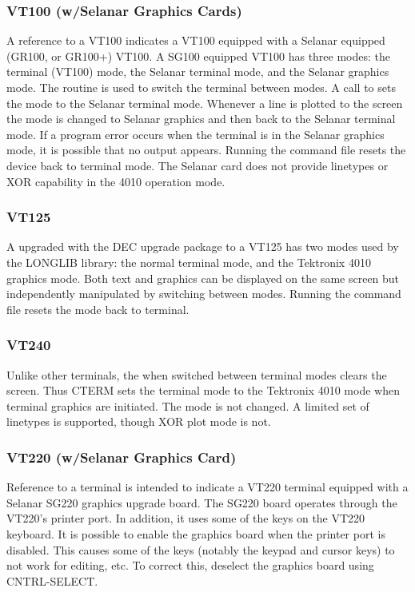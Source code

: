 \documentclass[11pt]{report}
\begin{document}
\subsubsection{VT100 (w/Selanar Graphics Cards)}

A reference to a VT100 indicates a VT100 equipped with a Selanar
equipped (GR100, or GR100+) VT100.  A SG100 equipped VT100 has three
modes: the terminal (VT100) mode, the Selanar terminal mode, and the
Selanar graphics mode.  The routine  is used to switch the
terminal between modes.  A call to  sets the mode to the
Selanar terminal mode.  Whenever a line is plotted to the screen the
mode is changed to Selanar graphics and then back to the Selanar
terminal mode.  If a program error occurs when the terminal is in the
Selanar graphics mode, it is possible that no output appears.
Running the  command file resets the device back to
terminal mode.  The Selanar card does not provide linetypes or XOR
capability in the 4010 operation mode.

\subsubsection{VT125}

A  upgraded with the DEC upgrade package to a VT125 has two
modes used by the LONGLIB library: the normal terminal mode, and the
Tektronix 4010 graphics mode.  Both text and graphics can be displayed
on the same screen but independently manipulated by switching between
modes.  Running the  command file resets the mode back
to terminal.

\subsubsection{VT240}

Unlike other terminals, the  when switched between terminal modes
clears the screen.  Thus CTERM sets the terminal mode to the Tektronix
4010 mode when terminal graphics are initiated.  The mode is not changed.
A limited set of linetypes is supported, though XOR plot mode is not.

\subsubsection{VT220 (w/Selanar Graphics Card)}

Reference to a  terminal is intended to indicate a VT220
terminal equipped with a Selanar SG220 graphics upgrade board.  The
SG220 board operates through the VT220's printer port.  In addition,
it uses some of the keys on the VT220 keyboard.  It is possible to
enable the graphics board when the printer port is disabled.  This
causes some of the keys (notably the keypad and cursor keys) to not
work for editing, etc.  To correct this, deselect the graphics board
using CNTRL-SELECT.
\end{document}
